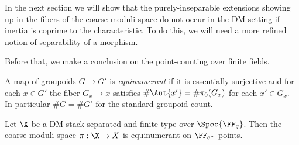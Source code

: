\documentclass[12pt]{article}
\begin{document}
\begin{rmk}
In the next section we will show that the purely-inseparable extensions showing up in the fibers of the coarse moduli space do not occur in the DM setting if inertia is coprime to the characteristic. To do this, we will need a more refined notion of separability of a morphism.
\end{rmk}

\begin{rmk}
Before that, we make a conclusion on the point-counting over finite fields. 
\end{rmk}

\begin{defn}
A map of groupoids $G \to G'$ is \textit{equinumerant} if it is essentially surjective and for each $x \in G'$ the fiber $G_x \to x$ satisfies $\# \Aut{x'} = \# \pi_0(G_x)$ for each $x' \in G_x$. In particular $\# G = \# G'$ for the standard groupoid count.
\end{defn}


\begin{prop}
Let $\X$ be a DM stack separated and finite type over $\Spec{\FF_q}$. Then the coarse moduli space $\pi : \X \to X$ is equinumerant on $\FF_{q^n}$-points.
\end{prop}

\newcommand{\act}[2]{\prescript{#1}{}{#2}}
\end{document}
